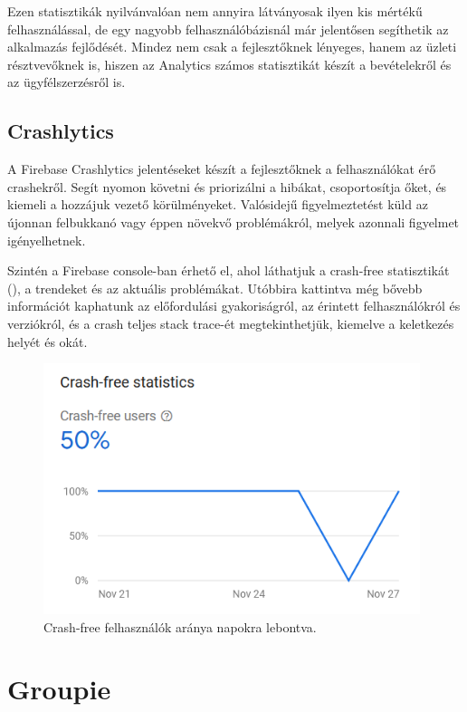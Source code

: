 Ezen statisztikák nyilvánvalóan nem annyira látványosak ilyen kis mértékű felhasználással, de egy nagyobb felhasználóbázisnál már jelentősen segíthetik az alkalmazás fejlődését. Mindez nem csak a fejlesztőknek lényeges, hanem az üzleti résztvevőknek is, hiszen az Analytics számos statisztikát készít a bevételekről és az ügyfélszerzésről is. 

\subsection{Crashlytics}
A Firebase Crashlytics jelentéseket készít a fejlesztőknek a felhasználókat érő crashekről. Segít nyomon követni és priorizálni a hibákat, csoportosítja őket, és kiemeli a hozzájuk vezető körülményeket. Valósidejű figyelmeztetést küld az újonnan felbukkanó vagy éppen növekvő problémákról, melyek azonnali figyelmet igényelhetnek. \cite{Crashlytics} 

Szintén a Firebase console-ban érhető el, ahol láthatjuk a crash-free statisztikát (), a trendeket és az aktuális problémákat. Utóbbira kattintva még bővebb információt kaphatunk az előfordulási gyakoriságról, az érintett felhasználókról és verziókról, és a crash teljes stack trace-ét megtekinthetjük, kiemelve a keletkezés helyét és okát. 

\begin{figure}[!ht]
	\centering
	\includegraphics[width=110mm, keepaspectratio]{figures/crashlytics_crashfree.png}
	\caption{Crash-free felhasználók aránya napokra lebontva.}
	\label{fig:CrashlyticsCrashfree}
\end{figure}

\section{Groupie}

